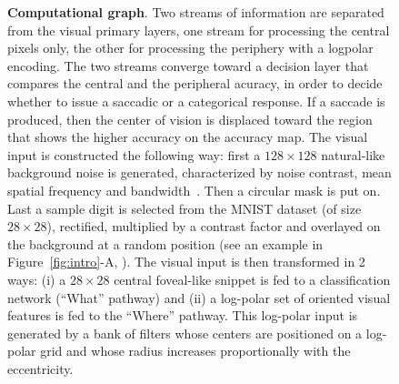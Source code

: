 \begin{figure}[t!]%
	\caption{%
		{\bf Computational graph}. Two streams of information are separated from the visual primary layers, one stream for processing the central pixels only, the other for processing the periphery with a logpolar encoding. The two streams converge toward a decision layer that compares the central and the peripheral acuracy, in order to decide whether to issue a saccadic or a categorical response. If a saccade is produced, then the center of vision is displaced toward the region that shows the higher accuracy on the accuracy map.
		\A The visual input is constructed the following way: first a  $128\times 128$  natural-like background noise is generated, characterized by noise contrast, mean spatial frequency and bandwidth~\cite{Sanz12}. Then a circular mask is put on. Last a sample digit is selected from the MNIST dataset (of size $28\times 28$), rectified, multiplied by a contrast factor and overlayed on the background at a random position (see an example in Figure~\ref{fig:intro}-A, \DIS ). %
		\B The visual input is then transformed in 2 ways: (i) a $28\times 28$ central foveal-like snippet is fed to a classification network (``What'' pathway) and (ii) a log-polar set of oriented visual features is fed to the ``Where'' pathway. This log-polar input is generated by a bank of filters whose centers are positioned on a log-polar grid and whose radius increases proportionally with the eccentricity. %
		\C
}
\end{figure}
